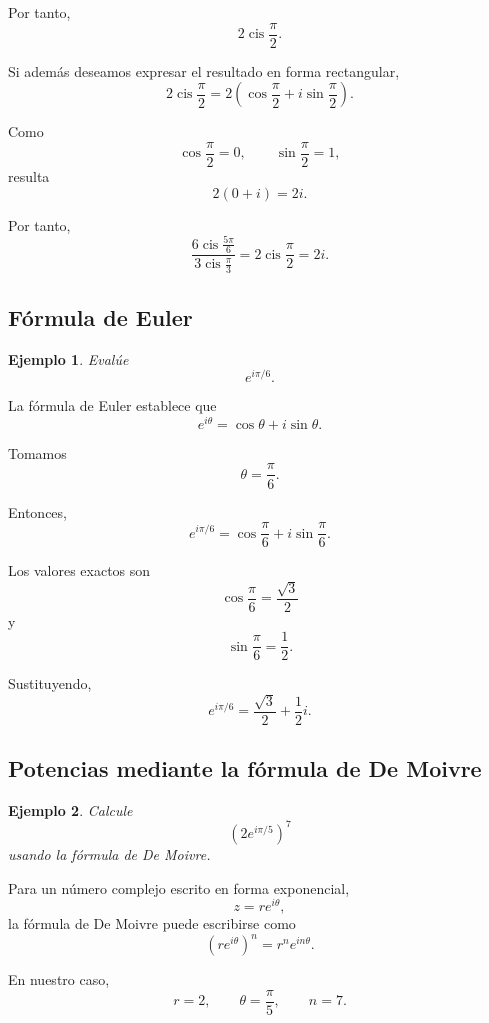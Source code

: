 \documentclass[12pt]{article}
\newtheorem{Ejem}{Ejemplo}
\begin{document}
Por tanto,
\[
\boxed{
2\operatorname{cis}\frac{\pi}{2}
}.
\]

Si además deseamos expresar el resultado en forma rectangular,
\[
2\operatorname{cis}\frac{\pi}{2}
=
2\left(
\cos\frac{\pi}{2}
+
i\sin\frac{\pi}{2}
\right).
\]

Como
\[
\cos\frac{\pi}{2}=0,
\qquad
\sin\frac{\pi}{2}=1,
\]
resulta
\[
2(0+i)=2i.
\]

Por tanto,
\[
\boxed{
\frac{
6\operatorname{cis}\frac{5\pi}{6}
}{
3\operatorname{cis}\frac{\pi}{3}
}
=
2\operatorname{cis}\frac{\pi}{2}
=
2i
}.
\]

\subsection{Fórmula de Euler}

\begin{Ejem}
Evalúe
\[
e^{i\pi/6}.
\]
\end{Ejem}

La fórmula de Euler establece que
\[
\boxed{
e^{i\theta}
=
\cos\theta+i\sin\theta
}.
\]

Tomamos
\[
\theta=\frac{\pi}{6}.
\]

Entonces,
\[
e^{i\pi/6}
=
\cos\frac{\pi}{6}
+
i\sin\frac{\pi}{6}.
\]

Los valores exactos son
\[
\cos\frac{\pi}{6}
=
\frac{\sqrt3}{2}
\]
y
\[
\sin\frac{\pi}{6}
=
\frac12.
\]

Sustituyendo,
\[
\boxed{
e^{i\pi/6}
=
\frac{\sqrt3}{2}
+
\frac12i
}.
\]

\subsection{Potencias mediante la fórmula de De Moivre}

\begin{Ejem}
Calcule
\[
\left(2e^{i\pi/5}\right)^7
\]
usando la fórmula de De Moivre.
\end{Ejem}

Para un número complejo escrito en forma exponencial,
\[
z=re^{i\theta},
\]
la fórmula de De Moivre puede escribirse como
\[
\boxed{
\left(re^{i\theta}\right)^n
=
r^ne^{in\theta}
}.
\]

En nuestro caso,
\[
r=2,
\qquad
\theta=\frac{\pi}{5},
\qquad
n=7.
\]
\end{document}
